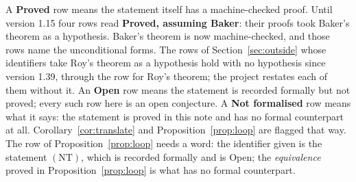 \documentclass[11pt,a4paper]{article}
\theoremstyle{plain}
\theoremstyle{definition}
\begin{document}
A \textbf{Proved} row means the statement itself has a machine-checked proof. Until version 1.15 four
rows read \textbf{Proved, assuming Baker}: their proofs took Baker's theorem as a hypothesis. Baker's
theorem is now machine-checked, and those rows name the unconditional forms. The rows of
Section~\ref{sec:outside} whose identifiers take Roy's theorem as a hypothesis hold with no hypothesis
since version 1.39, through the row for Roy's theorem; the project restates each of them without it.
An \textbf{Open}
row means the statement is recorded formally but not proved; every such row here is an open
conjecture. A \textbf{Not formalised} row means what it says: the statement is proved in this note and has no formal counterpart at all.
Corollary~\ref{cor:translate} and Proposition~\ref{prop:loop} are flagged that way. The row of
Proposition~\ref{prop:loop} needs a word: the identifier given
is the statement $(\mathrm{NT})$, which is recorded formally and is Open; the \emph{equivalence}
proved in Proposition~\ref{prop:loop} is what has no formal counterpart.
\end{document}
